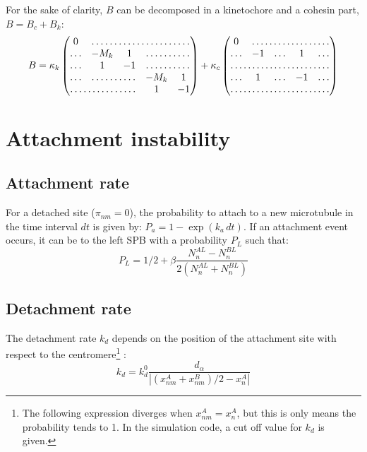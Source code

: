 \documentclass[a4paper,12pt]{article}
\begin{document}
For the sake of clarity, $B$ can be decomposed in a kinetochore and a
cohesin part, $B = B_c + B_k$:
\begin{equation}
  B = \kappa_k%
  \begin{pmatrix}
    \,0\, & \hdotsfor{4}\\
    \hdots &  - M_k  & 1 & \hdotsfor{2} \\
    \hdots & 1 & -1 &  \hdotsfor{2}\\
    \hdots &  \hdotsfor{2} & - M_k  & 1 \\
    \hdotsfor{3}  & 1 & - 1\\
  \end{pmatrix}
  + \kappa_c%
  \begin{pmatrix}
    \,0\, & \hdotsfor{4}\\
    \hdots & - 1 & \hdots & 1  & \hdots \\
    \hdotsfor{5}\\
    \hdots & 1 & \hdots & -1 & \hdots \\
    \hdotsfor{5}\\
  \end{pmatrix}
\end{equation}


\section{Attachment instability}

\subsection{Attachment rate}

For a detached site ($\pi_{nm} = 0$), the probability to attach to a
new microtubule in the time interval $dt$ is given by: $P_a = 1 -
\exp(k_a\,dt)$. If an attachment event occurs, it can be to the left
SPB with a probability $P_L$ such that:
\begin{equation}
  \label{eq:p_left}
  P_L =  1/2 + \beta \frac{N_n^{AL} - N_n^{BL}}{2(N_n^{AL} + N_n^{BL})}
\end{equation}

\subsection{Detachment rate}

The detachment rate $k_d$ depends on the position of the attachment
site with respect to the centromere\footnote{The following expression
  diverges when $ x_{nm}^A = x_n^A $, but this is only means the
  probability tends to 1. In the simulation code, a cut off value for
  $k_d$ is given.} :
\begin{equation}
  \label{eq:k_det}
  k_d = k_d^0 \frac{d_\alpha}{|(x_{nm}^A + x_{nm}^B)/2 - x_n^A|}
\end{equation}

\end{document}
